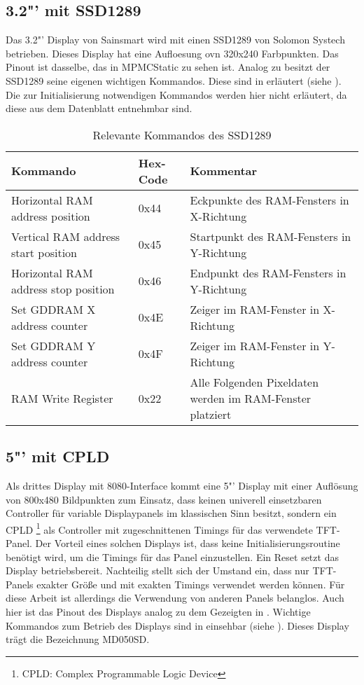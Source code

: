\subsection{3.2"' mit SSD1289}
Das 3.2"' Display von Sainsmart wird mit einen SSD1289 von Solomon Systech betrieben. Dieses Display hat eine Aufloesung ovn 320x240 Farbpunkten. Das Pinout ist dasselbe, das in MPMCStatic zu sehen ist. Analog zu  besitzt der SSD1289 seine eigenen wichtigen Kommandos. Diese sind in   erläutert (siehe \cite{SSD2007}). Die zur Initialisierung notwendigen Kommandos werden hier nicht erläutert, da diese aus dem Datenblatt entnehmbar sind.
\begin{table}[h]
\begin{tabular}{|p{4cm}|p{1cm}|p{8cm}|}\hline
\rowcolor{TableBackgroundColor}
   \textbf{Kommando} & \textbf{Hex-Code} & \textbf{Kommentar}\\ \hline
   Horizontal RAM address position & 0x44 & Eckpunkte des RAM-Fensters in X-Richtung \\ \hline
   Vertical RAM address start position & 0x45 & Startpunkt des RAM-Fensters in Y-Richtung \\ \hline
   Horizontal RAM address stop position & 0x46 & Endpunkt des  RAM-Fensters in Y-Richtung \\ \hline
   Set GDDRAM X address counter & 0x4E & Zeiger im  RAM-Fenster in X-Richtung \\ \hline
   Set GDDRAM Y address counter & 0x4F & Zeiger im RAM-Fenster in Y-Richtung \\ \hline
   RAM Write  Register & 0x22 & Alle Folgenden Pixeldaten werden im RAM-Fenster platziert \\ \hline
\end{tabular}
\caption{Relevante Kommandos des SSD1289}
\label{tab:Kommandos_SSD1289}
\end{table}


\subsection{5"' mit CPLD}
Als drittes Display mit 8080-Interface kommt eine 5"' Display mit einer Auflösung von 800x480 Bildpunkten zum Einsatz, dass keinen univerell einsetzbaren Controller für variable Displaypanels im klassischen Sinn besitzt, sondern ein CPLD \footnote{CPLD: Complex Programmable Logic Device} als Controller mit zugeschnittenen Timings für das verwendete TFT-Panel. Der Vorteil eines solchen Displays ist, dass keine Initialisierungsroutine benötigt wird, um die Timings für das Panel einzustellen. Ein Reset setzt das Display betriebsbereit. Nachteilig stellt sich der Umstand ein, dass nur TFT-Panels exakter Größe und mit exakten Timings verwendet werden können. Für diese Arbeit ist allerdings die Verwendung von anderen Panels belanglos. Auch hier ist das Pinout des Displays analog zu dem Gezeigten in .\newline
Wichtige Kommandos zum Betrieb des Displays sind in  einsehbar (siehe \cite{ITEAD2013}). Dieses Display trägt die Bezeichnung MD050SD.

